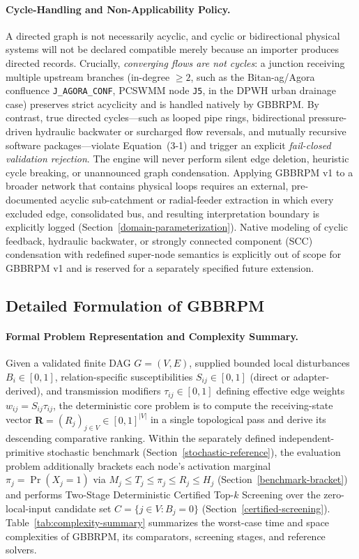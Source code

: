 \paragraph{Cycle-Handling and Non-Applicability Policy.}
A directed graph is not necessarily acyclic, and cyclic or bidirectional
physical systems will not be declared compatible merely because an importer
produces directed records. Crucially, \emph{converging flows are not cycles}:
a junction receiving multiple upstream branches (in-degree $\ge 2$, such as
the Bitan-ag/Agora confluence \texttt{J\_\allowbreak AGORA\_\allowbreak CONF},
PCSWMM node \texttt{J5}, in the DPWH urban drainage case) preserves strict
acyclicity and is handled natively by GBBRPM. By contrast, true directed
cycles---such as looped pipe rings, bidirectional pressure-driven hydraulic
backwater or surcharged flow reversals, and mutually recursive software
packages---violate Equation~(3-1) and trigger an explicit \emph{fail-closed
validation rejection}. The engine will never perform silent edge deletion,
heuristic cycle breaking, or unannounced graph condensation. Applying GBBRPM
v1 to a broader network that contains physical loops requires an external,
pre-documented acyclic sub-catchment or radial-feeder extraction in which
every excluded edge, consolidated bus, and resulting interpretation boundary
is explicitly logged (Section~\ref{domain-parameterization}). Native modeling
of cyclic feedback, hydraulic backwater, or strongly connected component
(SCC) condensation with redefined super-node semantics is explicitly out of
scope for GBBRPM v1 and is reserved for a separately specified future
extension.

\subsection{Detailed Formulation of GBBRPM}\label{model-formulation}

\paragraph{Formal Problem Representation and Complexity Summary.}
Given a validated finite DAG $G=(V,E)$, supplied bounded local disturbances
$B_i\in[0,1]$, relation-specific susceptibilities $S_{ij}\in[0,1]$ (direct or
adapter-derived), and transmission modifiers $\tau_{ij}\in[0,1]$ defining
effective edge weights $w_{ij}=S_{ij}\tau_{ij}$, the deterministic core
problem is to compute the receiving-state vector
$\mathbf{R}=(R_j)_{j\in V}\in[0,1]^{|V|}$ in a single topological pass and
derive its descending comparative ranking. Within the separately defined
independent-primitive stochastic benchmark (Section~\ref{stochastic-reference}),
the evaluation problem additionally brackets each node's activation marginal
$\pi_j=\Pr(X_j=1)$ via $M_j\le T_j\le\pi_j\le R_j\le H_j$
(Section~\ref{benchmark-bracket}) and performs Two-Stage Deterministic
Certified Top-$k$ Screening over the zero-local-input candidate set
$C=\{j\in V: B_j=0\}$ (Section~\ref{certified-screening}).
Table~\ref{tab:complexity-summary} summarizes the worst-case time and space
complexities of GBBRPM, its comparators, screening stages, and reference
solvers.

